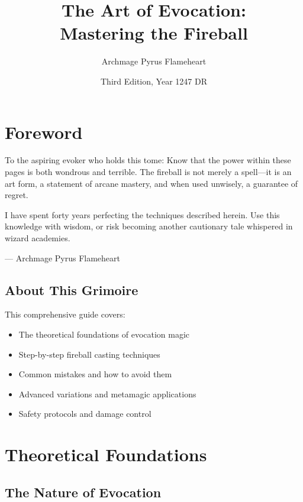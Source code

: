 \documentclass[letterpaper,twocolumn,openany]{dndbook}
\title{The Art of Evocation:\\Mastering the Fireball}
\author{Archmage Pyrus Flameheart}
\date{Third Edition, Year 1247 DR}
\begin{document}
\frontmatter

\maketitle

\tableofcontents

\mainmatter

\chapter{Foreword}

\begin{DndReadAloud}
    To the aspiring evoker who holds this tome: Know that the power within these pages is both wondrous and terrible. The fireball is not merely a spell—it is an art form, a statement of arcane mastery, and when used unwisely, a guarantee of regret.

    I have spent forty years perfecting the techniques described herein. Use this knowledge with wisdom, or risk becoming another cautionary tale whispered in wizard academies.

    \hfill — Archmage Pyrus Flameheart
\end{DndReadAloud}

\section{About This Grimoire}

This comprehensive guide covers:

\begin{itemize}
    \item The theoretical foundations of evocation magic
    \item Step-by-step fireball casting techniques
    \item Common mistakes and how to avoid them
    \item Advanced variations and metamagic applications
    \item Safety protocols and damage control
\end{itemize}

\chapter{Theoretical Foundations}

\section{The Nature of Evocation}
\end{document}
